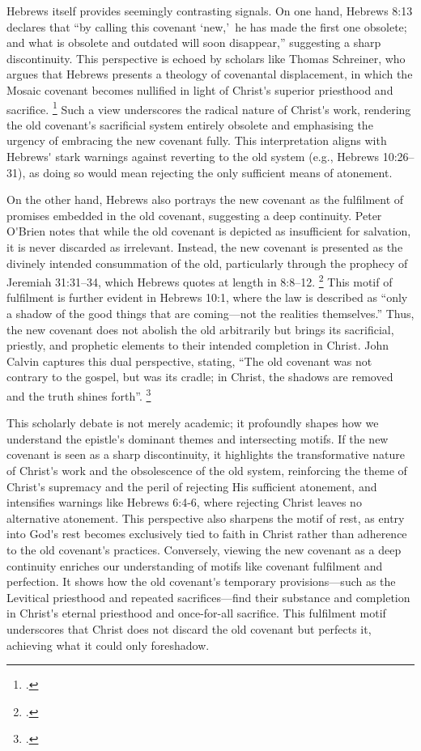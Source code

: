 \documentclass[12pt]{article}
\def\apos{^^27}         %
\def\christ{the Messiah}
\def\christ{Christ}
\begin{document}
Hebrews itself provides seemingly contrasting signals. On one hand, Hebrews 8:13
declares that ``by calling this covenant \lq{}new,\rq\ he has made the first one
obsolete; and what is obsolete and outdated will soon disappear,'' suggesting a
sharp discontinuity.
%
This perspective is echoed by scholars like Thomas Schreiner, who argues that
Hebrews presents a theology of covenantal displacement, in which the Mosaic
covenant becomes nullified in light of \christ{}\apos{}s superior priesthood and
sacrifice. \footcite[204]{Schreiner2017}
%
Such a view underscores the radical nature of \christ{}\apos{}s work, rendering
the old covenant\apos{}s sacrificial system entirely obsolete and emphasising
the urgency of embracing the new covenant fully.
%
This interpretation aligns with Hebrews\apos{} stark warnings against reverting
to the old system (e.g., Hebrews 10:26--31), as doing so would mean rejecting
the only sufficient means of atonement.

On the other hand, Hebrews also portrays the new covenant as the fulfilment of
promises embedded in the old covenant, suggesting a deep continuity. Peter
O\apos{}Brien notes that while the old covenant is depicted as insufficient for
salvation, it is never discarded as irrelevant. Instead, the new covenant is
presented as the divinely intended consummation of the old, particularly through
the prophecy of Jeremiah 31:31--34, which Hebrews quotes at length in 8:8--12.
\footcite[296]{OBrien2010} This motif of fulfilment is further evident in
Hebrews 10:1, where the law is described as ``only a shadow of the good things
that are coming---not the realities themselves.'' Thus, the new covenant does
not abolish the old arbitrarily but brings its sacrificial, priestly, and
prophetic elements to their intended completion in \christ{}. John Calvin
captures this dual perspective, stating, ``The old covenant was not contrary to
the gospel, but was its cradle; in \christ{}, the shadows are removed and the
truth shines forth''.  \footcite[45]{Calvin1853}

This scholarly debate is not merely academic; it profoundly shapes how we
understand the epistle\apos{}s dominant themes and intersecting motifs.
%
If the new covenant is seen as a sharp discontinuity, it highlights the
transformative nature of \christ{}\apos{}s work and the obsolescence of the old
system, reinforcing the theme of \christ{}\apos{}s supremacy and the peril of
rejecting His sufficient atonement, and intensifies warnings like Hebrews 6:4-6,
where rejecting \christ{} leaves no alternative atonement.
%
This perspective also sharpens the motif of rest, as entry into God\apos{}s rest
becomes exclusively tied to faith in \christ{} rather than adherence to the old
covenant\apos{}s practices.
%
Conversely, viewing the new covenant as a deep continuity enriches our
understanding of motifs like covenant fulfilment and perfection.
%
It shows how the old covenant\apos{}s temporary provisions—such as the Levitical
priesthood and repeated sacrifices—find their substance and completion in
\christ{}\apos{}s eternal priesthood and once-for-all sacrifice.
%
This fulfilment motif underscores that \christ{} does not discard the old
covenant but perfects it, achieving what it could only foreshadow.
\end{document}

